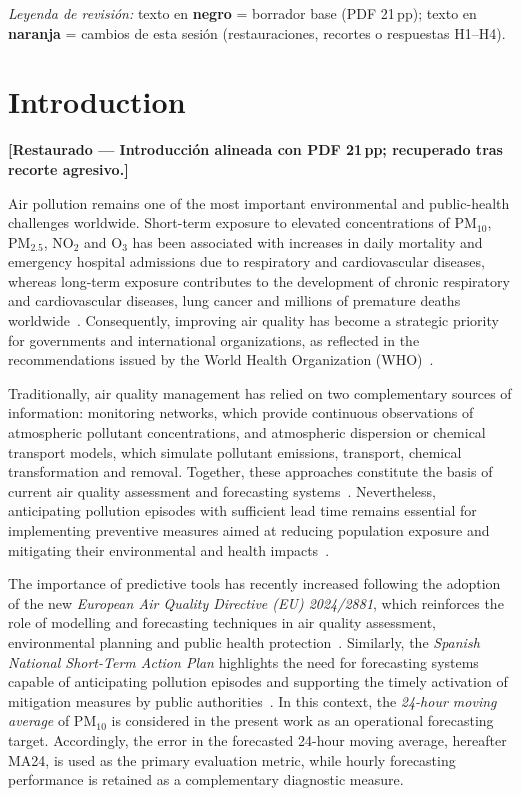 \documentclass[11pt]{article}
\newcommand{\revnew}[1]{\textcolor{orange!75!black}{#1}}
\newenvironment{revnewblock}{%
  \begingroup\color{orange!75!black}%
}{%
  \endgroup%
}
\begin{document}
\noindent\revnew{\textit{Leyenda de revisión:} texto en \textbf{negro} = borrador base (PDF 21\,pp); texto en \textbf{naranja} = cambios de esta sesión (restauraciones, recortes o respuestas H1--H4).}

\section{Introduction}
\label{sec:introduction}

\begin{revnewblock}
\noindent\textbf{[Restaurado --- Introducción alineada con PDF 21\,pp; recuperado tras recorte agresivo.]}\par
Air pollution remains one of the most important environmental and public-health challenges worldwide. Short-term exposure to elevated concentrations of PM$_{10}$, PM$_{2.5}$, NO$_2$ and O$_3$ has been associated with increases in daily mortality and emergency hospital admissions due to respiratory and cardiovascular diseases, whereas long-term exposure contributes to the development of chronic respiratory and cardiovascular diseases, lung cancer and millions of premature deaths worldwide~\cite{Huang2024,EEA,RuizPaez2023}. Consequently, improving air quality has become a strategic priority for governments and international organizations, as reflected in the recommendations issued by the World Health Organization (WHO)~\cite{WHO}.

Traditionally, air quality management has relied on two complementary sources of information: monitoring networks, which provide continuous observations of atmospheric pollutant concentrations, and atmospheric dispersion or chemical transport models, which simulate pollutant emissions, transport, chemical transformation and removal. Together, these approaches constitute the basis of current air quality assessment and forecasting systems~\cite{WHO2023}. Nevertheless, anticipating pollution episodes with sufficient lead time remains essential for implementing preventive measures aimed at reducing population exposure and mitigating their environmental and health impacts~\cite{Gao2024}.

The importance of predictive tools has recently increased following the adoption of the new \textit{European Air Quality Directive (EU) 2024/2881}, which reinforces the role of modelling and forecasting techniques in air quality assessment, environmental planning and public health protection~\cite{EUdir}. Similarly, the \textit{Spanish National Short-Term Action Plan} highlights the need for forecasting systems capable of anticipating pollution episodes and supporting the timely activation of mitigation measures by public authorities~\cite{MITECO2021}. In this context, the \textit{24-hour moving average} of PM$_{10}$ is considered in the present work as an operational forecasting target. Accordingly, the error in the forecasted 24-hour moving average, hereafter MA24, is used as the primary evaluation metric, while hourly forecasting performance is retained as a complementary diagnostic measure.


\end{revnewblock}
\end{document}
